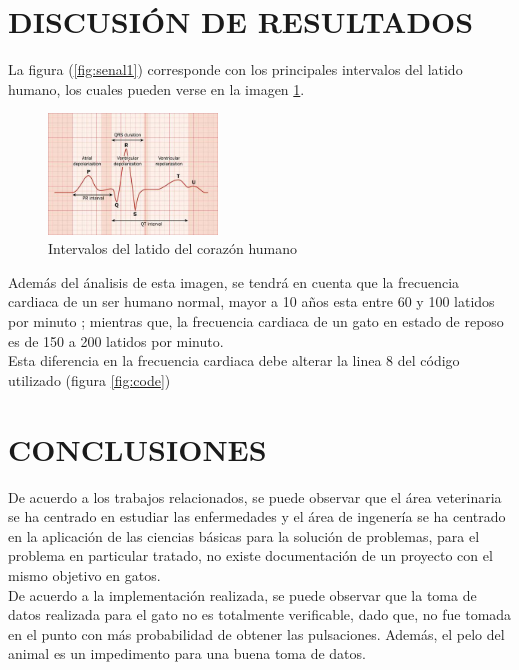 \documentclass[letterpaper, 10 pt, conference]{ieeeconf}  %
\begin{document}
\section{DISCUSI\'ON DE RESULTADOS}

La figura (\ref{fig:senal1}) corresponde con los principales intervalos del latido humano, los cuales pueden verse en la imagen \ref{fig:intervalo}.\\

\begin{figure}
\centering
\includegraphics[width=0.40\textwidth]{ecg.jpg}
\caption{Intervalos del latido del coraz\'on humano}
\label{fig:intervalo}
\end{figure}

Adem\'as del \'analisis de esta imagen, se tendr\'a en cuenta que la frecuencia cardiaca de un ser humano normal, mayor a 10 a\~{n}os esta entre 60 y 100 latidos por minuto \cite{c10}; mientras que, la frecuencia cardiaca de un gato en estado de reposo es de 150 a 200 latidos por minuto.\\

Esta diferencia en la frecuencia cardiaca debe alterar la linea 8 del c\'odigo utilizado (figura \ref{fig:code})

\section{CONCLUSIONES}

De acuerdo a los trabajos relacionados, se puede observar que el \'area veterinaria se ha centrado en estudiar las enfermedades y el \'area de ingener\'ia se ha centrado en la aplicaci\'on de las ciencias b\'asicas para la soluci\'on de problemas, para el problema en particular tratado, no existe documentaci\'on de un proyecto con el mismo objetivo en gatos.\\



De acuerdo a la implementaci\'on realizada, se puede observar que la toma de datos realizada para el gato no es totalmente verificable, dado que, no fue tomada en el punto con m\'as probabilidad de obtener las pulsaciones. Adem\'as, el pelo del animal es un impedimento para una buena toma de datos.
\end{document}
